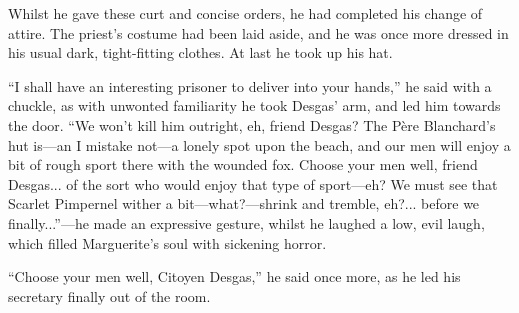 Whilst he gave these curt and concise orders, he had completed his change of attire. The priest's costume had been laid aside, and he was once more dressed in his usual dark, tight-fitting clothes. At last he took up his hat.

\enquote{I shall have an interesting prisoner to deliver into your hands,} he said with a chuckle, as with unwonted familiarity he took Desgas’ arm, and led him towards the door. \enquote{We won't kill him outright, eh, friend Desgas? The Père Blanchard's hut is---an I mistake not---a lonely spot upon the beach, and our men will enjoy a bit of rough sport there with the wounded fox. Choose your men well, friend Desgas... of the sort who would enjoy that type of sport---eh? We must see that Scarlet Pimpernel wither a bit---what?---shrink and tremble, eh?... before we finally...}---he made an expressive gesture, whilst he laughed a low, evil laugh, which filled Marguerite's soul with sickening horror.

\enquote{Choose your men well, Citoyen Desgas,} he said once more, as he led his secretary finally out of the room.
